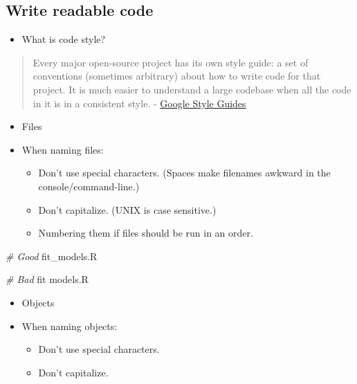 \documentclass[
]{book}
\newenvironment{Shaded}{\begin{snugshade}}{\end{snugshade}}
\newcommand{\CommentTok}[1]{\textcolor[rgb]{0.56,0.35,0.01}{\textit{#1}}}
\newcommand{\NormalTok}[1]{#1}
\providecommand{\tightlist}{%
  \setlength{\itemsep}{0pt}\setlength{\parskip}{0pt}}
\begin{document}
\hypertarget{write-readable-code}{%
\subsection{Write readable code}\label{write-readable-code}}

\begin{itemize}
\tightlist
\item
  What is code style?
\end{itemize}

\begin{quote}
Every major open-source project has its own style guide: a set of conventions (sometimes arbitrary) about how to write code for that project. It is much easier to understand a large codebase when all the code in it is in a consistent style. - \href{https://google.github.io/styleguide/}{Google Style Guides}
\end{quote}

\begin{itemize}
\tightlist
\item
  Files
\item
  When naming files:

  \begin{itemize}
  \tightlist
  \item
    Don't use special characters. (Spaces make filenames awkward in the console/command-line.)
  \item
    Don't capitalize. (UNIX is case sensitive.)
  \item
    Numbering them if files should be run in an order.
  \end{itemize}
\end{itemize}

\begin{Shaded}
\begin{Highlighting}[]
\CommentTok{\# Good}
\NormalTok{fit\_models.R}

\CommentTok{\# Bad}
\NormalTok{fit models.R}
\end{Highlighting}
\end{Shaded}

\begin{itemize}
\tightlist
\item
  Objects
\item
  When naming objects:

  \begin{itemize}
  \tightlist
  \item
    Don't use special characters.
  \item
    Don't capitalize.
  \end{itemize}
\end{itemize}
\end{document}
